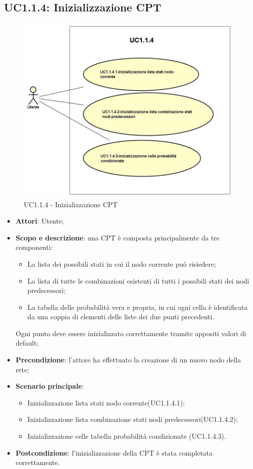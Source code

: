 \subsection{UC1.1.4: Inizializzazione CPT} 
\hypertarget{UC1.1.4}{} 
\begin{figure} [H]
	\centering
	\includegraphics[scale=0.45]{Img/UC1-1-4} 
	\caption{UC1.1.4 - Inizializzazione CPT} \label{} 
\end{figure} 
\begin{itemize} 
	\item{\textbf{Attori}: Utente;} 
	\item{\textbf{Scopo e descrizione}: una CPT è composta principalmente da tre componenti: 
		\begin{itemize} 
			\item{La lista dei possibili stati in cui il nodo corrente può risiedere;} 
			\item{La lista di tutte le combinazioni esistenti di tutti i possibili stati dei nodi predecessori;} 
			\item{La tabella delle probabilità vera e propria, in cui ogni cella è identificata da una coppia di elementi delle liste dei due punti precedenti.} 
		\end{itemize} 			
		Ogni punto deve essere inizializzato correttamente tramite appositi valori di default;
	} 
	\item{\textbf{Precondizione}: l'attore ha effettuato la creazione di un nuovo nodo della rete;} 
	\item{\textbf{Scenario principale}: } 
	\begin{itemize} 
		\item{Inizializzazione lista stati nodo corrente(UC1.1.4.1);} 
		\item{Inizializzazione lista combinazione stati nodi predecessori(UC1.1.4.2);} 
		\item{Inizializzazione celle tabella probabilità condizionate (UC1.1.4.3).} 
	\end{itemize} 
	\item{\textbf{Postcondizione}: l'inizializzazione della CPT è stata completata correttamente.} 
\end{itemize} 

